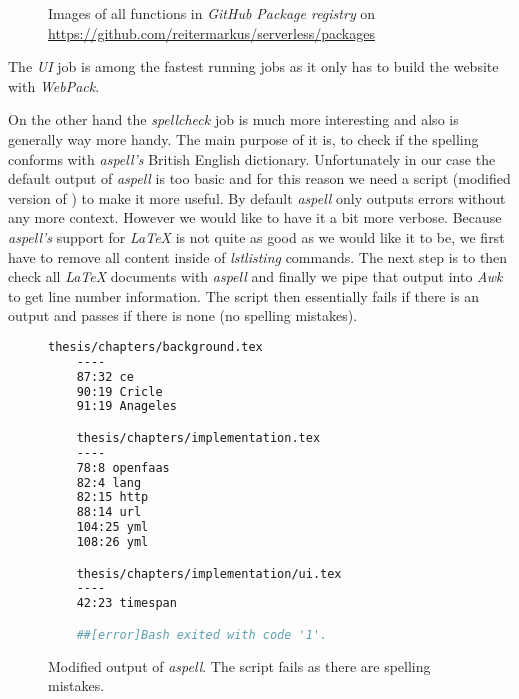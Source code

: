 \begin{figure}[H]
  \centering
  \caption{Images of all functions in \textit{GitHub Package registry} on \url{https://github.com/reitermarkus/serverless/packages}}
\end{figure}

The \textit{UI} job is among the fastest running jobs as it only has to build the website with
\textit{WebPack}.

On the other hand the \textit{spellcheck} job is much more interesting and also is generally way
more handy. The main purpose of it is, to check if the spelling conforms with \textit{aspell's}
British English dictionary. Unfortunately in our case the default output of \textit{aspell} is too
basic and for this reason we need a script (modified version of \cite{aspell-awk}) to make it more
useful. By default \textit{aspell} only outputs errors without any more context. However we would
like to have it a bit more verbose. Because \textit{aspell's} support for \textit{LaTeX} is not
quite as good as we would like it to be, we first have to remove all content inside of
\textit{lstlisting} commands. The next step is to then check all \textit{LaTeX} documents with
\textit{aspell} and finally we pipe that output into \textit{Awk} to get line number information.
The script then essentially fails if there is an output and passes if there is none (no spelling
mistakes).

\begin{figure}[H]
  \begin{lstlisting}[language=bash]
    thesis/chapters/background.tex
    ----
    87:32 ce
    90:19 Cricle
    91:19 Anageles

    thesis/chapters/implementation.tex
    ----
    78:8 openfaas
    82:4 lang
    82:15 http
    88:14 url
    104:25 yml
    108:26 yml

    thesis/chapters/implementation/ui.tex
    ----
    42:23 timespan

    ##[error]Bash exited with code '1'.
  \end{lstlisting}
  \caption{Modified output of \textit{aspell}. The script fails as there are spelling mistakes.}
\end{figure}

